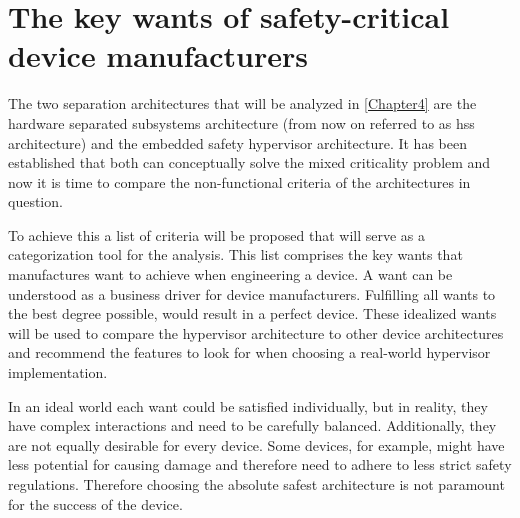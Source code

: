 
\chapter{The key wants of safety-critical device manufacturers} %

\label{Chapter3} %




The two separation architectures that will be analyzed in \ref{Chapter4} are the hardware separated subsystems architecture (from now on referred to as \acrshort{hss} architecture) and the embedded safety hypervisor architecture. It has been established that both can conceptually solve the mixed criticality problem and now it is time to compare the non-functional criteria of the architectures in question. 

To achieve this a list of criteria will be proposed that will serve as a categorization tool for the analysis.
This list comprises the key wants that manufactures want to achieve when engineering a device. A want can be understood as a business driver for device manufacturers. Fulfilling all wants to the best degree possible, would result in a perfect device. These idealized wants will be used to compare the hypervisor architecture to other device architectures and recommend the features to look for when choosing a real-world hypervisor implementation.

In an ideal world each want could be satisfied individually, but in reality, they have complex interactions and need to be carefully balanced. 
Additionally, they are not equally desirable for every device. Some devices, for example, might have less potential for causing damage and therefore need to adhere to less strict safety regulations. Therefore choosing the absolute safest architecture is not paramount for the success of the device.

